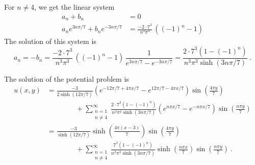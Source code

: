 \begin{egg}
For $n\neq 4$, we get the linear system
\begin{align*}
a_n + b_n &= 0 \\
a_n e^{3n\pi/7} + b_n e^{-3n \pi/7} &=
\frac{-2\cdot 7^3}{n^3\pi^3}\, \left((-1)^n - 1\right)
\end{align*}
The solution of this system is
\[
a_n = -b_n = \frac{-2\cdot 7^3}{n^3\pi^3}\,\left((-1)^n - 1\right)\,
\frac{1}{e^{3n\pi/7} - e^{-3n\pi/7}}
= \frac{2\cdot 7^3 (1 - (-1)^n)}{n^3\pi^3 \sinh(3 n\pi/7)} \ .
\]

The solution of the potential problem is
\begin{align*}
u(x,y) &= \frac{-3}{2\sinh(12\pi/7)}
  \left(e^{-12\pi/7 +4\pi x/7} - e^{12\pi/7 - 4\pi x /7}\right)
  \sin\left(\frac{4\pi y}{7}\right) \\
&\qquad\qquad + \sum_{\substack{n=1\\n\neq 4}}^\infty
\frac{2\cdot 7^3 (1 - (-1)^n)}{n^3\pi^3\sinh(3 n\pi/7)}
\left(e^{n\pi x/7} - e^{-n\pi x/7}\right)\sin\left(\frac{n\pi y}{7}\right) \\
&= \frac{-3}{\sinh(12\pi/7)}\sinh\left(\frac{4\pi(x-3)}{7}\right)
\sin\left(\frac{4\pi y}{7}\right) \\
&\qquad\qquad + \sum_{\substack{n=1\\n\neq 4}}^\infty
\frac{7^3 (1 - (-1)^n)}{n^3\pi^3\sinh(3 n\pi/7)}
  \sinh\left(\frac{n\pi x}{7}\right)\sin\left(\frac{n\pi y}{7}\right) \ .
\end{align*}
\end{egg}

